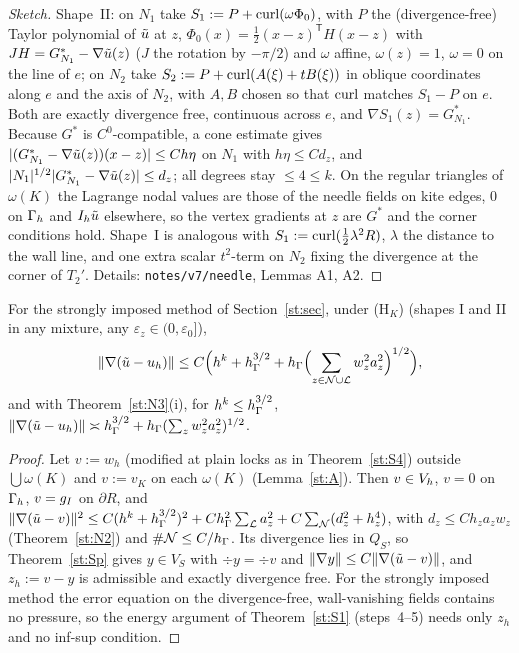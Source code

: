 \begin{proof}[Sketch]
Shape~II: on $N_1$ take $S_1:=P+\operatorname{curl}(\omega\Phi_0)$, with $P$ the (divergence-free) Taylor polynomial of $\tilde u$ at $z$, $\Phi_0(x)=\frac12(x-z)^{\mathsf T}H(x-z)$ with $JH=G^\ast_{N_1}-\nabla\tilde u(z)$ ($J$ the rotation by $-\pi/2$) and $\omega$ affine, $\omega(z)=1$, $\omega=0$ on the line of $e$; on $N_2$ take $S_2:=P+\operatorname{curl}(A(\xi)+tB(\xi))$ in oblique coordinates along $e$ and the axis of $N_2$, with $A,B$ chosen so that $\operatorname{curl}$ matches $S_1-P$ on $e$. Both are exactly divergence free, continuous across $e$, and $\nabla S_1(z)=G^\ast_{N_1}$. Because $G^\ast$ is $C^0$-compatible, a cone estimate gives $|(G^\ast_{N_1}-\nabla\tilde u(z))(x-z)|\le Ch\eta$ on $N_1$ with $h\eta\le Cd_z$, and $|N_1|^{1/2}|G^\ast_{N_1}-\nabla\tilde u(z)|\le d_z$; all degrees stay $\le4\le k$. On the regular triangles of $\omega(K)$ the Lagrange nodal values are those of the needle fields on kite edges, $0$ on $\Gamma_h$ and $I_h\tilde u$ elsewhere, so the vertex gradients at $z$ are $G^\ast$ and the corner conditions hold. Shape~I is analogous with $S_1:=\operatorname{curl}(\frac12\lambda^2R)$, $\lambda$ the distance to the wall line, and one extra scalar $t^2$-term on $N_2$ fixing the divergence at the corner of $T_2'$. Details: \texttt{notes/v7/needle}, Lemmas A1, A2.
\end{proof}

\begin{theorem}\label{st:N3u}
For the strongly imposed method of Section~\ref{st:sec}, under (H$_K$) (shapes I and II in any mixture, any $\varepsilon_z\in(0,\varepsilon_0]$),
\[
\lVert \nabla(\tilde u-u_h)\rVert\le C\Bigl(h^k+h_\Gamma^{3/2}+h_\Gamma\Bigl(\sum_{z\in\mathcal N\cup\mathcal L}w_z^2a_z^2\Bigr)^{1/2}\Bigr),
\]
and with Theorem~\ref{st:N3}(i), for $h^k\le h_\Gamma^{3/2}$, $\lVert \nabla(\tilde u-u_h)\rVert\asymp h_\Gamma^{3/2}+h_\Gamma(\sum_zw_z^2a_z^2)^{1/2}$.
\end{theorem}

\begin{proof}
Let $v:=w_h$ (modified at plain locks as in Theorem~\ref{st:S4}) outside $\bigcup\omega(K)$ and $v:=v_K$ on each $\omega(K)$ (Lemma~\ref{st:A}). Then $v\in V_h$, $v=0$ on $\Gamma_h$, $v=g_I$ on $\partial R$, and $\lVert \nabla(\tilde u-v)\rVert^2\le C(h^k+h_\Gamma^{3/2})^2+Ch_\Gamma^2\sum_{\mathcal L}a_z^2+C\sum_{\mathcal N}(d_z^2+h_z^4)$, with $d_z\le Ch_za_zw_z$ (Theorem~\ref{st:N2}) and $\#\mathcal N\le C/h_\Gamma$. Its divergence lies in $Q_S$, so Theorem~\ref{st:Sp} gives $y\in V_S$ with $\div y=\div v$ and $\lVert \nabla y\rVert\le C\lVert \nabla(\tilde u-v)\rVert$, and $z_h:=v-y$ is admissible and exactly divergence free. For the strongly imposed method the error equation on the divergence-free, wall-vanishing fields contains no pressure, so the energy argument of Theorem~\ref{st:S1} (steps~4--5) needs only $z_h$ and no inf-sup condition.
\end{proof}

